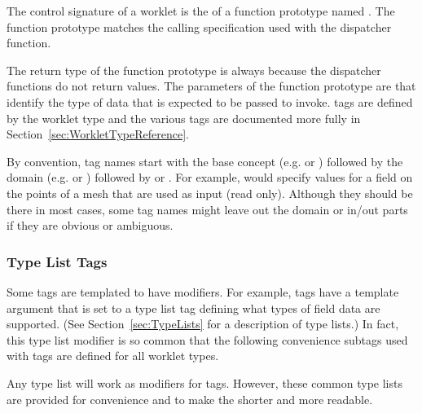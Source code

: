 
The control signature of a worklet is the  of a function
prototype named \controlsignature. The function prototype matches the
calling specification used with the dispatcher  function.


The return type of the function prototype is always  because
the dispatcher  functions do not return values. The
parameters of the function prototype are 
that identify the type of data that is expected to be passed to invoke.
\controlsignature tags are defined by the worklet type and the various tags
are documented more fully in Section~\ref{sec:WorkletTypeReference}.

By convention, \controlsignature tag names start with the base concept
(e.g.  or ) followed by the
domain (e.g.  or ) followed by
 or . For example,
 would specify values for a field on the points of a
mesh that are used as input (read only). Although they should be there in
most cases, some tag names might leave out the domain or in/out parts if
they are obvious or ambiguous.

\subsubsection{Type List Tags}
\label{sec:TypeListTags}


Some tags are templated to have modifiers. For example,
 tags have a template argument that is set to a type
list tag defining what types of field data are supported. (See
Section~\ref{sec:TypeLists} for a description of type lists.) In fact, this
type list modifier is so common that the following convenience subtags used
with  tags are defined for all worklet types.

\begin{didyouknow}
  Any type list will work as modifiers for \controlsignature tags. However,
  these common type lists are provided for convenience and to make the
  \controlsignature shorter and more readable.
\end{didyouknow}

